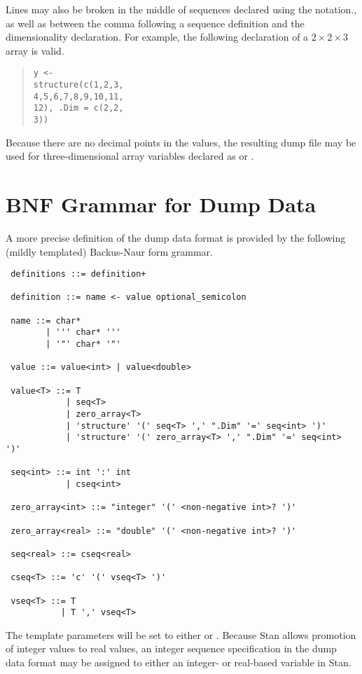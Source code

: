 Lines may also be broken in the middle of sequences declared
using the  notation., as well as between the comma
following a sequence definition and the dimensionality declaration.
For example, the following declaration of a $2 \times 2 \times 3$
array is valid.
%
\begin{quote}
\begin{Verbatim}
y <-
structure(c(1,2,3,
4,5,6,7,8,9,10,11,
12), .Dim = c(2,2,
3))
\end{Verbatim}
\end{quote}
%
Because there are no decimal points in the values, the resulting dump
file may be used for three-dimensional array variables declared as
 or .

\section{BNF Grammar for Dump Data}

A more precise definition of the dump data format is provided
by the following (mildly templated) Backus-Naur form grammar.

{\small 
\begin{verbatim}
 definitions ::= definition+

 definition ::= name <- value optional_semicolon

 name ::= char* 
        | ''' char* ''' 
        | '"' char* '"'

 value ::= value<int> | value<double>

 value<T> ::= T 
            | seq<T>
            | zero_array<T>
            | 'structure' '(' seq<T> ',' ".Dim" '=' seq<int> ')'
            | 'structure' '(' zero_array<T> ',' ".Dim" '=' seq<int> ')'

 seq<int> ::= int ':' int
            | cseq<int>

 zero_array<int> ::= "integer" '(' <non-negative int>? ')'

 zero_array<real> ::= "double" '(' <non-negative int>? ')'

 seq<real> ::= cseq<real>

 cseq<T> ::= 'c' '(' vseq<T> ')'

 vseq<T> ::= T
           | T ',' vseq<T>
\end{verbatim}
}
\noindent
The template parameters  will be set to either  or
.  Because Stan allows promotion of integer values to real
values, an integer sequence specification in the dump data format may
be assigned to either an integer- or real-based variable in Stan.



